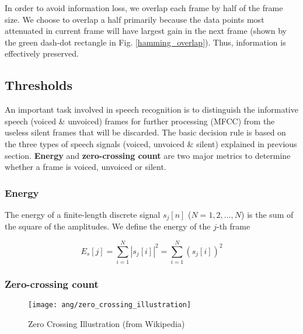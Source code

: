 In order to avoid information loss, we overlap each frame by half of the frame size. We choose to overlap a half primarily because the data points most attenuated in current frame will have largest gain in the next frame (shown by the green dash-dot rectangle in Fig. \ref{hamming_overlap}). Thus, information is effectively preserved.


\subsection{Thresholds}

An important task involved in speech recognition is to distinguish the informative speech (voiced \& unvoiced) frames for further processing (MFCC) from the useless silent frames that will be discarded. The basic decision rule is based on the three types of speech signals (voiced, unvoiced \& silent) explained in previous section. \textbf{Energy} and \textbf{zero-crossing count} are two major metrics to determine whether a frame is voiced, unvoiced or silent.


\subsubsection{Energy}

The energy of a finite-length discrete signal $s_j[n]$ ($N = 1, 2, \dots, N$) is the sum of the square of the amplitudes. We define the energy of the $j$-th frame

\begin{equation}
\label{eq:frame-energy}
E_s[j] = \sum_{i=1}^{N} |s_j[i]|^2 = \sum_{i=1}^{N} (s_j[i])^2
\end{equation}


\subsubsection{Zero-crossing count}

\begin{figure}[H]
\centering
\texttt{[image: ang/zero\_crossing\_illustration]}
\caption{Zero Crossing Illustration (from Wikipedia)}
\label{zero_crossing_illustration}
\end{figure}

